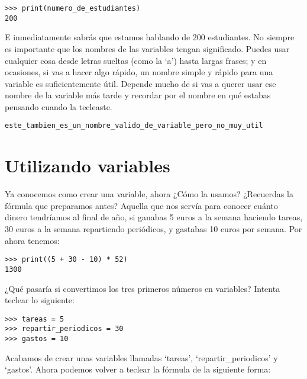 \begin{listing}
\begin{verbatim}
>>> print(numero_de_estudiantes)
200
\end{verbatim}
\end{listing}

\noindent
E inmediatamente sabrás que estamos hablando de 200 estudiantes.  No siempre es importante que los nombres de las variables tengan significado. Puedes usar cualquier cosa desde letras sueltas (como la `a') hasta largas frases; y en ocasiones, si vas a hacer algo rápido, un nombre simple y rápido para una variable es suficientemente útil.  Depende mucho de si vas a querer usar ese nombre de la variable más tarde y recordar por el nombre en qué estabas pensando cuando la tecleaste.

\begin{listing}
\begin{verbatim}
este_tambien_es_un_nombre_valido_de_variable_pero_no_muy_util
\end{verbatim}
\end{listing}

\section{Utilizando variables}

Ya conocemos como crear una variable, ahora ¿Cómo la usamos?  ¿Recuerdas la fórmula que preparamos antes?  Aquella que nos servía para conocer cuánto dinero tendríamos al final de año, si ganabas 5 euros a la semana haciendo tareas, 30 euros a la semana repartiendo periódicos, y gastabas 10 euros por semana.  Por ahora tenemos: 

\begin{listing}
\begin{verbatim}
>>> print((5 + 30 - 10) * 52)
1300
\end{verbatim}
\end{listing}

\noindent
¿Qué pasaría si convertimos los tres primeros números en variables?  Intenta teclear lo siguiente:

\begin{listing}
\begin{verbatim}
>>> tareas = 5
>>> repartir_periodicos = 30
>>> gastos = 10
\end{verbatim}
\end{listing}

\noindent
Acabamos de crear unas variables llamadas `tareas', `repartir\_periodicos' y `gastos'. Ahora podemos volver a teclear la fórmula de la siguiente forma:

